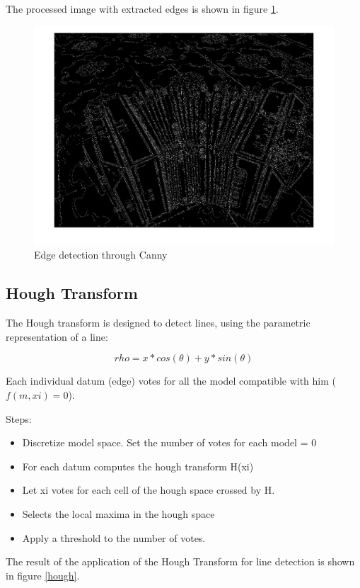 \documentclass[11pt, oneside]{article}   	%
\begin{document}
The processed image with extracted edges is shown in figure \ref{edge}.

\begin{figure}

\includegraphics[width=0.8\linewidth]{edges.jpg}

\caption{Edge detection through Canny}
\label{edge}

\end{figure}

\subsection{Hough Transform} 
The Hough transform is designed to detect lines, using the parametric representation of a line:

$$rho = x*cos(\theta) + y*sin(\theta) $$

Each individual datum (edge) votes for all the model compatible with him ( $f(m,xi) = 0 $).

Steps:

\begin{itemize}
\item Discretize model space. Set the number of votes for each model = 0
\item For each datum computes the hough transform H(xi)
\item Let xi votes for each cell of the hough space crossed by H.
\item Selects the local maxima in the hough space
\item Apply a threshold to the number of votes.
\end{itemize}

The result of the application of the Hough Transform for line detection is shown in figure \ref{hough}.
\end{document}
